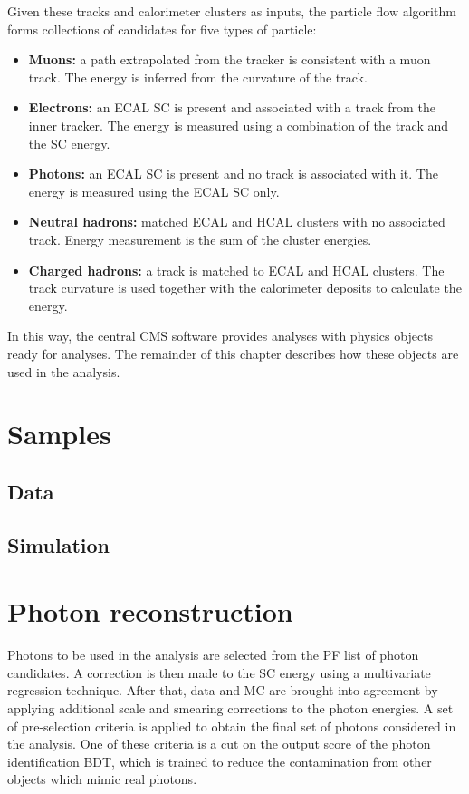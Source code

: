 Given these tracks and calorimeter clusters as inputs, the particle flow algorithm forms collections of candidates for five types of particle:
\begin{itemize}
  \item{\textbf{Muons:} a path extrapolated from the tracker is consistent with a muon track. 
                        The energy is inferred from the curvature of the track.} %
  \item{\textbf{Electrons:} an ECAL SC is present and associated with a track from the inner tracker. 
                            The energy is measured using a combination of the track \pt and the SC energy.}
  \item{\textbf{Photons:} an ECAL SC is present and no track is associated with it.
                          The energy is measured using the ECAL SC only.}
  \item{\textbf{Neutral hadrons:} matched ECAL and HCAL clusters with no associated track.
                                 Energy measurement is the sum of the cluster energies.}
  \item{\textbf{Charged hadrons:} a track is matched to ECAL and HCAL clusters.
                                 The track curvature is used together with the calorimeter deposits to calculate the energy.}
\end{itemize}
In this way, the central CMS software provides analyses with physics objects ready for analyses.
The remainder of this chapter describes how these objects are used in the \Hgg analysis.

\section{Samples}
\subsection{Data}
\subsection{Simulation}

\section{Photon reconstruction}

Photons to be used in the \Hgg analysis are selected from the PF list of photon candidates.
A correction is then made to the SC energy using a multivariate regression technique.
After that, data and MC are brought into agreement by applying additional scale and smearing corrections to the photon energies.
A set of pre-selection criteria is applied to obtain the final set of photons considered in the analysis.
One of these criteria is a cut on the output score of the photon identification BDT, 
which is trained to reduce the contamination from other objects which mimic real photons.

